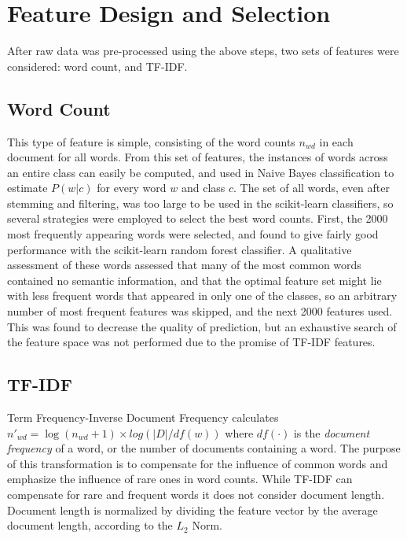 \documentclass[10pt,twocolumn]{article}
\begin{document}
\section*{Feature Design and Selection}

After raw data was pre-processed using the above steps, two sets of features were considered: word count, and TF-IDF.

\subsection*{Word Count}

This type of feature is simple, consisting of the word counts $n_{wd}$ in each document for all words. From this set of features, the instances of words across an entire class can easily be computed, and used in Naive Bayes classification to estimate $P(w | c)$ for every word $w$ and class $c$. The set of all words, even after stemming and filtering, was too large to be used in the scikit-learn classifiers, so several strategies were employed to select the best word counts.  First, the 2000 most frequently appearing words were selected, and found to give fairly good performance with the scikit-learn random forest classifier.  A qualitative assessment of these words assessed that many of the most common words contained no semantic information, and that the optimal feature set might lie with less frequent words that appeared in only one of the classes, so an arbitrary number of most frequent features was skipped, and the next 2000 features used.  This was found to decrease the quality of prediction, but an exhaustive search of the feature space was not performed due to the promise of TF-IDF features.

\subsection*{TF-IDF}

Term Frequency-Inverse Document Frequency calculates $n'_{wd} = \log (n_{wd} + 1) \times log (|D| / df(w))$ where $df(\cdot)$ is the \emph{document frequency} of a word, or the number of documents containing a word. The purpose of this transformation is to compensate for the influence of common words and emphasize the influence of rare ones in word counts. While TF-IDF can compensate for rare and frequent words it does not consider document length. Document length is normalized by dividing the feature vector by the average document length, according to the $L_2$ Norm.
\end{document}
